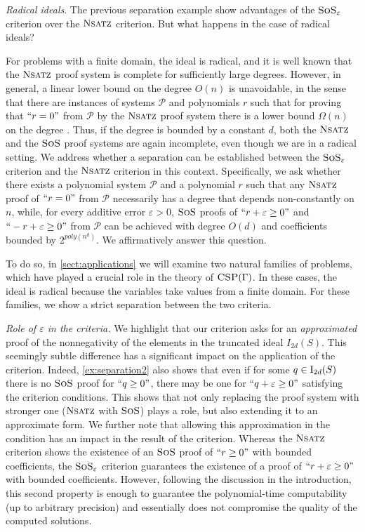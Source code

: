 \documentclass[11pt]{article}
\newcommand{\sos}{\text{\sc{SoS}}}
\newcommand{\CSP}{\textsc{CSP}}
\newcommand{\Nsatz}{\textsc{Nsatz}}
\newcommand{\I}{\emph{$\rm{I}$}}
\newcommand{\1}{\textbf{1}}
\begin{document}
\textit{Radical ideals}. The previous separation example show advantages of the $\sos_{\varepsilon}$ criterion over the $\Nsatz$ criterion. But what happens in the case of radical ideals? 

For problems with a finite domain, the ideal is radical, and it is well known that the $\Nsatz$ proof system is complete for sufficiently large degrees. 
However, in general, a linear lower bound on the degree $O(n)$ is unavoidable, in the sense that there are instances of systems $\mathcal{P}$ and polynomials $r$ such that for proving that $``r=0"$ from $\mathcal{P}$ by the $\Nsatz$ proof system there is a lower bound $\Omega(n)$ on the degree \cite{Buss96}. Thus, if the degree is bounded by a constant $d$, both the $\Nsatz$ and the $\sos$ proof systems are again incomplete, even though we are in a radical setting. We address whether a separation can be established between the \(\sos_{\varepsilon}\) criterion and the \(\Nsatz\) criterion in this context. Specifically, we ask whether there exists a polynomial system \(\mathcal{P}\) and a polynomial \(r\) such that any \(\Nsatz\) proof of \(``r = 0"\) from \(\mathcal{P}\) necessarily has a degree that depends non-constantly on \(n\), while, for every additive error \(\varepsilon > 0\), \(\sos\) proofs of \(``r + \varepsilon \geq 0"\) and \(``-r + \varepsilon \geq 0"\) from \(\mathcal{P}\) can be achieved with degree \(O(d)\) and coefficients bounded by \(2^{poly(n^d)}\). We affirmatively answer this question.

To do so, in \cref{sect:applications} we will examine two natural families of problems, which have played a crucial role in the theory of $\CSP(\Gamma)$. In these cases, the ideal is radical because the variables take values from a finite domain. For these families, we show a strict separation between the two criteria.

\emph{Role of $\varepsilon$ in the criteria.} We highlight that our criterion asks for an {\em approximated} proof of the nonnegativity of the elements in the truncated ideal $I_{2d}(S)$. This seemingly subtle difference has a significant impact on the application of the criterion.
Indeed, \cref{ex:separation2} also shows that even if for some $q\in \I_{2d}(S)$ there is no $\sos$ proof for $``q\geq 0"$, there may be one for $``q+\varepsilon\geq 0"$ satisfying the criterion conditions. This shows that not only replacing the proof system with stronger one ($\Nsatz$ with $\sos$) plays a role, but also extending it to an approximate form. 
%
We further note that allowing this approximation in the condition has an impact in the result of the criterion. Whereas the $\Nsatz$ criterion shows the existence of an $\sos$ proof of $``r\geq 0"$ with bounded coefficients, the  $\sos_{\varepsilon}$ criterion guarantees the existence of a proof of $``r+\varepsilon\geq 0"$ with bounded coefficients. However, following the discussion in the introduction, this second property is enough to guarantee the polynomial-time computability (up to arbitrary precision) and essentially does not compromise the quality of the computed solutions. 
\end{document}
